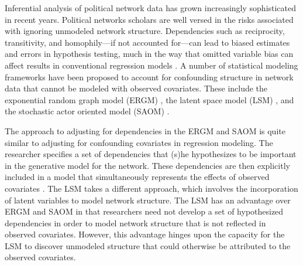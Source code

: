 \documentclass[11pt]{article}
\begin{document}
Inferential analysis of political network data has grown increasingly
sophisticated in recent years. Political networks scholars are well
versed in the risks associated with ignoring unmodeled network
structure. Dependencies such as reciprocity, transitivity, and
homophily---if not accounted for---can lead to biased estimates and
errors in hypothesis testing, much in the way that omitted variable
bias can affect results in conventional regression models
\citep{ward2007disputes,kinne2014,cranmerisq,hays2010spatial}. A
number of statistical modeling frameworks have been proposed to
account for confounding structure in network data that cannot be
modeled with observed covariates. These include the exponential random
graph model (ERGM) \citep[e.g.,
][]{lazer2010,cranmer2011pa,desmarais2012psj}, the latent space model
(LSM) \citep[e.g.,
][]{ward2007disputes,ward2007persistent,kirkland2012multimember}, and
the stochastic actor oriented model (SAOM) \citep[e.g.,
][]{berardo2010ajps,kinne2014}.

The approach to adjusting for dependencies in the ERGM and SAOM is
quite similar to adjusting for confounding covariates in regression
modeling. The researcher specifies a set of dependencies that (s)he
hypothesizes to be important in the generative model for the
network. These dependencies are then explicitly included in a model
that simultaneously represents the effects of observed covariates
\citep{cranmer2011pa}. The LSM takes a different approach, which
involves the incorporation of latent variables to model network
structure. The LSM has an advantage over ERGM and SAOM in that
researchers need not develop a set of hypothesized dependencies in
order to model network structure that is not reflected in observed
covariates. However, this advantage hinges upon the capacity for the
LSM to discover unmodeled structure that could otherwise be attributed
to the observed covariates.
\end{document}

